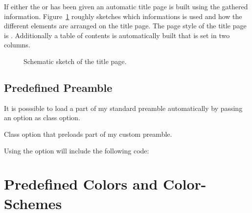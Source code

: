 \documentclass[load-preamble]{cnltx-doc}
\begin{document}
If either the  or  has been given an automatic
title page is built using the gathered information. Figure~\ref{fig:titlepage}
roughly sketches which informations is used and how the different elements are
arranged on the title page.  The page style of the title page is
.  Additionally a  table of contents is automatically built that
is set in two columns.

\begin{figure}[htb]
  \centering
  \caption{Schematic sketch of the title page.}
  \label{fig:titlepage}
\end{figure}

\subsection{Predefined Preamble}\label{sec:preamble}

It is posssible to load a part of my standard preamble automatically by
passing an option as class option.
\begin{options}
    Class option that preloads part of my custom preamble.
\end{options}

Using the option will include the following code:

\begin{sourcecode}
  \RequirePackage[oldstyle]{libertine}
  \RequirePackage{libertinehologopatch}%
  \RequirePackage[supstfm=libertinesups]{superiors}
  \RequirePackage{microtype}
  \RequirePackage[scaled=.83]{beramono}
  \RequirePackage{fnpct}
  \RequirePackage[english]{babel}
  \renewcommand*\othersectionlevelsformat[3]{%
    \textcolor{cnltx}{#3\autodot}\enskip}
  \renewcommand*\partformat{%
    \textcolor{cnltx}{\partname~\thepart\autodot}}
\end{sourcecode}

\section{Predefined Colors and Color-Schemes}\label{sec:colors}
\end{document}
